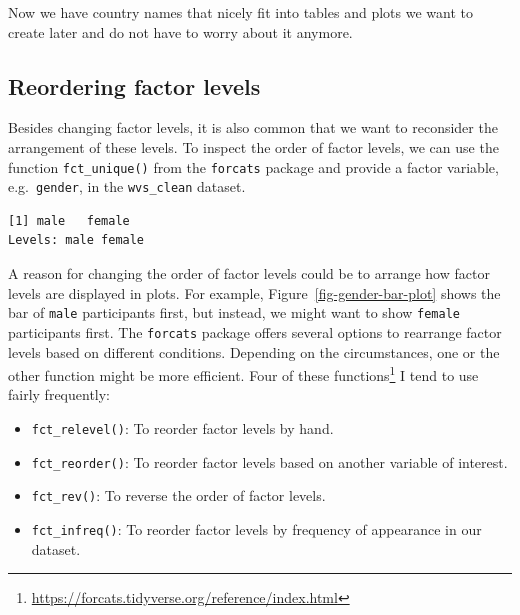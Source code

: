 \documentclass[
  letterpaper,
]{krantz}
\makeatletter
\newenvironment{Shaded}{\begin{snugshade}}{\end{snugshade}}
\newcommand{\FunctionTok}[1]{\textcolor[rgb]{0.28,0.35,0.67}{#1}}
\newcommand{\NormalTok}[1]{\textcolor[rgb]{0.00,0.23,0.31}{#1}}
\newcommand{\SpecialCharTok}[1]{\textcolor[rgb]{0.37,0.37,0.37}{#1}}
\renewcommand{\href}[2]{#2\footnote{\url{#1}}}
\newenvironment{kframe}{%
\medskip{}
\setlength{\fboxsep}{.8em}
 \def\at@end@of@kframe{}%
 \ifinner\ifhmode%
  \def\at@end@of@kframe{\end{minipage}}%
  \begin{minipage}{\columnwidth}%
 \fi\fi%
 \def\FrameCommand##1{\hskip\@totalleftmargin \hskip-\fboxsep
 \colorbox{shadecolor}{##1}\hskip-\fboxsep
     \hskip-\linewidth \hskip-\@totalleftmargin \hskip\columnwidth}%
 \MakeFramed {\advance\hsize-\width
   \@totalleftmargin\z@ \linewidth\hsize
   \@setminipage}}%
 {\par\unskip\endMakeFramed%
 \at@end@of@kframe}
\renewenvironment{Shaded}{\begin{kframe}}{\end{kframe}}
\makeatother
\begin{document}
Now we have country names that nicely fit into tables and plots we want
to create later and do not have to worry about it anymore.

\subsection{Reordering factor
levels}\label{sec-reordering-factor-levels}

Besides changing factor levels, it is also common that we want to
reconsider the arrangement of these levels. To inspect the order of
factor levels, we can use the function \texttt{fct\_unique()} from the
\texttt{forcats} package and provide a factor variable,
e.g.~\texttt{gender}, in the \texttt{wvs\_clean} dataset.

\begin{Shaded}
\end{Shaded}

\begin{verbatim}
[1] male   female
Levels: male female
\end{verbatim}

A reason for changing the order of factor levels could be to arrange how
factor levels are displayed in plots. For example,
Figure~\ref{fig-gender-bar-plot} shows the bar of \texttt{male}
participants first, but instead, we might want to show \texttt{female}
participants first. The \texttt{forcats} package offers several options
to rearrange factor levels based on different conditions. Depending on
the circumstances, one or the other function might be more efficient.
Four of \href{https://forcats.tidyverse.org/reference/index.html}{these
functions} I tend to use fairly frequently:

\begin{itemize}
\item
  \texttt{fct\_relevel()}: To reorder factor levels by hand.
\item
  \texttt{fct\_reorder()}: To reorder factor levels based on another
  variable of interest.
\item
  \texttt{fct\_rev()}: To reverse the order of factor levels.
\item
  \texttt{fct\_infreq()}: To reorder factor levels by frequency of
  appearance in our dataset.
\end{itemize}
\end{document}
